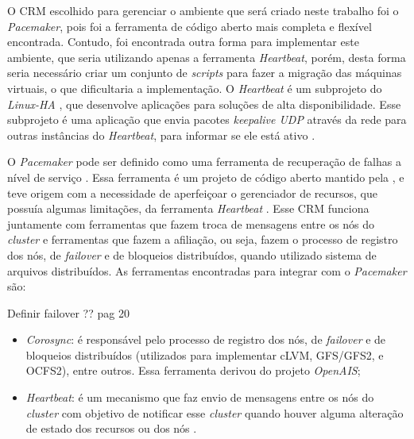 O \ac{CRM} escolhido para gerenciar o ambiente que será criado neste trabalho foi o \textit{Pacemaker}, pois foi a ferramenta de código aberto
mais completa e flexível encontrada. Contudo, foi encontrada outra forma para implementar este ambiente, que seria utilizando apenas a 
ferramenta \textit{Heartbeat}, porém, desta forma seria necessário criar um conjunto de \textit{scripts} para fazer a migração das máquinas 
virtuais, o que dificultaria a implementação.
O \textit{Heartbeat} é um subprojeto do \textit{Linux-HA} \cite{linuxha}, que desenvolve aplicações para soluções de alta disponibilidade.
Esse subprojeto é uma aplicação que envia pacotes \textit{keepalive \ac{UDP}} através da rede para outras instâncias do \textit{Heartbeat}, para
informar se ele está ativo \cite{reis2009}.

O \textit{Pacemaker} \cite{pacemaker} pode ser definido como uma ferramenta de recuperação de falhas a nível de serviço \cite{perkov2011}. 
Essa ferramenta é um projeto de código aberto mantido pela \cite{clusterlabs}, e teve origem com a necessidade de aperfeiçoar o gerenciador 
de recursos, que possuía algumas limitações, da ferramenta \textit{Heartbeat} \cite{heartbeat}. Esse \ac{CRM} funciona juntamente com ferramentas
que fazem troca de mensagens entre os nós do \textit{cluster} e ferramentas que fazem a afiliação, ou seja, fazem o processo de registro dos
nós, de \textit{failover} e de bloqueios distribuídos, quando utilizado sistema de arquivos distribuídos. 
As ferramentas encontradas para integrar com o \textit{Pacemaker} são:

Definir failover ??
\cite{bassan2008} pag 20

\begin{itemize}
 \item \textit{Corosync}: é responsável pelo processo de registro dos nós, de \textit{failover} e de bloqueios distribuídos (utilizados para 
 implementar cLVM, GFS/GFS2, e OCFS2), entre outros. Essa ferramenta derivou do projeto \textit{OpenAIS};
 \item \textit{Heartbeat}: é um mecanismo que faz envio de mensagens entre os nós do \textit{cluster} com objetivo de notificar esse 
 \textit{cluster} quando houver alguma alteração de estado dos recursos ou dos nós \cite{clusterlabs}.
\end{itemize}

